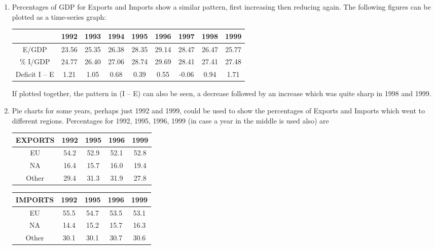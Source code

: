 \documentclass[a4paper,12pt]{article}
\begin{document}
\begin{enumerate}

 
 
\item  Percentages of GDP for Exports and Imports show a similar pattern, first increasing then reducing again.  The following figures can be plotted as a time-series graph: 

\begin{center}
\begin{tabular}{c|cccccccc} 
  & 1992& 1993& 1994& 1995& 1996& 1997& 1998& 1999\\  \hline
  E/GDP & 23.56 & 25.35&  26.38&  28.35&  29.14 & 28.47 & 26.47 & 25.77 \\        
  \% I/GDP & 24.77 & 26.40&  27.06&  28.74 & 29.69&  28.41 & 27.41&  27.48 \\ \hline
  Deficit I – E & 1.21 & 1.05 & 0.68 & 0.39&  0.55&  -0.06 & 0.94 & 1.71 \\
 \end{tabular}
 \end{center}
  
 
If plotted together, the pattern in (I – E) can also be seen, a decrease followed by an increase which was quite sharp in 1998 and 1999. 
 
\item Pie charts for some years, perhaps just 1992 and 1999, could be used to show the percentages of Exports and Imports which went to different regions.  Percentages for 1992, 1995, 1996, 1999 (in case a year in the middle is used also) are 

\begin{center}
\begin{tabular}{c|cccc} 
EXPORTS &  1992 & 1995 & 1996 & 1999 \\ \hline
EU &  54.2 & 52.9 & 52.1 & 52.8 \\
NA & 16.4 & 15.7 & 16.0&  19.4 \\
Other&  29.4&  31.3&  31.9&  27.8\\ 
\end{tabular}
\end{center}

\begin{center}
\begin{tabular}{c|cccc} 
IMPORTS  &  1992 & 1995 & 1996 & 1999 \\ \hline 
EU & 55.5 & 54.7 & 53.5 & 53.1 \\ 
NA & 14.4 & 15.2 & 15.7 & 16.3 \\ 
Other & 30.1&  30.1& 30.7 & 30.6\\ 
\end{tabular}
\end{center}
 

\end{enumerate}
\end{document}

